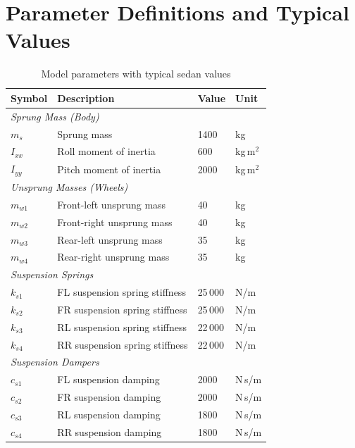 \documentclass[11pt]{article}
\begin{document}
\section{Parameter Definitions and Typical Values}

\begin{table}[h]
\centering
\caption{Model parameters with typical sedan values}
\label{tab:params}
\begin{tabular}{@{}llll@{}}
\toprule
\textbf{Symbol} & \textbf{Description} & \textbf{Value} & \textbf{Unit} \\
\midrule
\multicolumn{4}{l}{\textit{Sprung Mass (Body)}} \\
$m_s$    & Sprung mass                     & 1400   & kg \\
$I_{xx}$ & Roll moment of inertia          & 600    & kg\,m$^2$ \\
$I_{yy}$ & Pitch moment of inertia         & 2000   & kg\,m$^2$ \\
\midrule
\multicolumn{4}{l}{\textit{Unsprung Masses (Wheels)}} \\
$m_{w1}$ & Front-left unsprung mass        & 40     & kg \\
$m_{w2}$ & Front-right unsprung mass       & 40     & kg \\
$m_{w3}$ & Rear-left unsprung mass         & 35     & kg \\
$m_{w4}$ & Rear-right unsprung mass        & 35     & kg \\
\midrule
\multicolumn{4}{l}{\textit{Suspension Springs}} \\
$k_{s1}$ & FL suspension spring stiffness  & 25\,000 & N/m \\
$k_{s2}$ & FR suspension spring stiffness  & 25\,000 & N/m \\
$k_{s3}$ & RL suspension spring stiffness  & 22\,000 & N/m \\
$k_{s4}$ & RR suspension spring stiffness  & 22\,000 & N/m \\
\midrule
\multicolumn{4}{l}{\textit{Suspension Dampers}} \\
$c_{s1}$ & FL suspension damping           & 2000   & N\,s/m \\
$c_{s2}$ & FR suspension damping           & 2000   & N\,s/m \\
$c_{s3}$ & RL suspension damping           & 1800   & N\,s/m \\
$c_{s4}$ & RR suspension damping           & 1800   & N\,s/m \\

\end{tabular}
\end{table}
\end{document}
